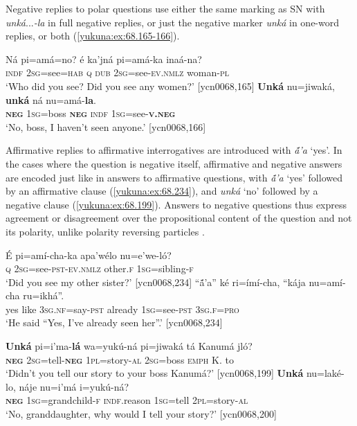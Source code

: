 \documentclass[output=paper,colorlinks,citecolor=brown]{langscibook}
\begin{document}
Negative replies to polar questions use either the same marking as SN with \textit{unká}{...}\textit{-la} in full negative replies, or just the negative marker \textit{unká} in one-word replies, or both (\ref{yukuna:ex:68.165-166}).

\ea\label{yukuna:ex:68.165-166}
    \begin{xlist}[Q: ]\label{yukuna:ex:68.165} 
        \gll Ná pi=amá=no?   é ka'jná pi=amá-ka inaá-na?   \\
        \textsc{indf} \textsc{2sg}=see=\textsc{hab} \textsc{q} \textsc{dub} \textsc{2sg}=see-\textsc{ev.nmlz} woman-\textsc{pl} \\
        \glt ‘Who did you see? Did you see any women?’ [ycn0068,165]
    \label{yukuna:ex:68.166}
        \gll \textbf{Unká} nu=jiwaká, \textbf{unká} ná nu=amá-\textbf{la}. \\
        \textbf{\textsc{neg}} \textsc{1sg}=boss \textbf{\textsc{neg}} \textsc{indf} \textsc{1sg}=see-\textbf{\textsc{v.neg}} \\
        \glt ‘No, boss, I haven't seen anyone.’ [ycn0068,166]
    \end{xlist}
\z

Affirmative replies to affirmative interrogatives are introduced with \textit{ã́'a} `yes’. In the cases where the question is negative itself, affirmative and negative answers are encoded just like in answers to affirmative questions, with \textit{ã́'a} ‘yes’ followed by an affirmative clause (\ref{yukuna:ex:68.234}), and \textit{unká} `no’ followed by a negative clause (\ref{yukuna:ex:68.199}).  Answers to negative questions thus express agreement or disagreement over the propositional content of the question and not its polarity, unlike polarity reversing particles \citep{Holmberg2016,EnfieldEtAl2019}.

\ea\label{yukuna:ex:68.234}
\ea
\gll É pi=amí-cha-ka apa'wélo nu=e'we-ló? \\
\textsc{q} \textsc{2sg}=see-\textsc{pst-ev.nmlz} other.\textsc{f} \textsc{1sg}=sibling-\textsc{f} \\
\glt ‘Did you see my other sister?’ [ycn0068,234]
\ex 
\gll   “ã́'a” ké ri=ímí-cha, “kája nu=amí-cha ru=ikhá”. \\
yes like \textsc{3sg.nf}=say-\textsc{pst} already \textsc{1sg}=see-\textsc{pst} \textsc{3sg.f}=\textsc{pro} \\
\glt ‘He said “Yes, I've already seen her”.’ [ycn0068,234]
\z
\z

\ea\label{yukuna:ex:68.199}
\ea
\gll \textbf{Unká} pi=i'ma-\textbf{lá} wa=yukú-ná pi=jiwaká tá Kanumá jló? \\
\textbf{\textsc{neg}} \textsc{2sg}=tell-\textbf{\textsc{neg}} \textsc{1pl}=story-\textsc{al} \textsc{2sg}=boss \textsc{emph} K. to\\
\glt ‘Didn't you tell our story to your boss Kanumá?’ [ycn0068,199]
\ex 
\gll \textbf{Unká} nu=laké-lo, náje nu=i'má i=yukú-ná? \\
\textbf{\textsc{neg}} \textsc{1sg}=grandchild-\textsc{f} \textsc{indf}.reason \textsc{1sg}=tell \textsc{2pl}=story-\textsc{al} \\
\glt ‘No, granddaughter, why would I tell your story?’ [ycn0068,200]
\z
\z
\end{document}
